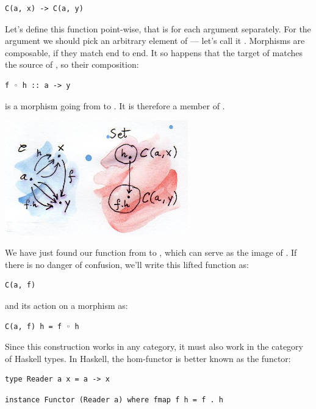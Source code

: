 \begin{verbatim}
C(a, x) -> C(a, y)
\end{verbatim}

Let's define this function point-wise, that is for each argument
separately. For the argument we should pick an arbitrary element of
 --- let's call it . Morphisms are
composable, if they match end to end. It so happens that the target of
 matches the source of , so their composition:

\begin{verbatim}
f ◦ h :: a -> y
\end{verbatim}

is a morphism going from  to . It is therefore a
member of .

\includegraphics[width=3.12500in]{images/hom-functor.jpg}

We have just found our function from  to
, which can serve as the image of . If there
is no danger of confusion, we'll write this lifted function as:

\begin{verbatim}
C(a, f)
\end{verbatim}

and its action on a morphism  as:

\begin{verbatim}
C(a, f) h = f ◦ h
\end{verbatim}

Since this construction works in any category, it must also work in the
category of Haskell types. In Haskell, the hom-functor is better known
as the  functor:

\begin{verbatim}
type Reader a x = a -> x
\end{verbatim}

\begin{verbatim}
instance Functor (Reader a) where fmap f h = f . h
\end{verbatim}

